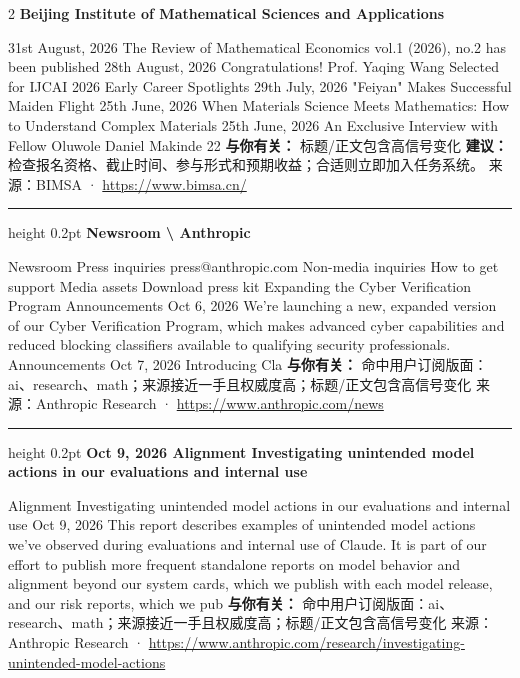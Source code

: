 \documentclass[10.5pt]{ctexart}
\begin{document}
\begin{multicols}{2}
{\large\bfseries Beijing Institute of Mathematical Sciences and Applications}\par
31st August, 2026 The Review of Mathematical Economics vol.1 (2026), no.2 has been published 28th August, 2026 Congratulations! Prof. Yaqing Wang Selected for IJCAI 2026 Early Career Spotlights 29th July, 2026 "Feiyan" Makes Successful Maiden Flight 25th June, 2026 When Materials Science Meets Mathematics: How to Understand Complex Materials 25th June, 2026 An Exclusive Interview with Fellow Oluwole Daniel Makinde 22
\textbf{与你有关：} 标题/正文包含高信号变化
\textbf{建议：} 检查报名资格、截止时间、参与形式和预期收益；合适则立即加入任务系统。
{\footnotesize\color{ormuted} 来源：BIMSA · \url{https://www.bimsa.cn/}}
\vspace{2mm}
\hrule height 0.2pt
\vspace{2mm}
{\large\bfseries Newsroom \textbackslash{} Anthropic}\par
Newsroom Press inquiries press@anthropic.com Non-media inquiries How to get support Media assets Download press kit Expanding the Cyber Verification Program Announcements Oct 6, 2026 We’re launching a new, expanded version of our Cyber Verification Program, which makes advanced cyber capabilities and reduced blocking classifiers available to qualifying security professionals. Announcements Oct 7, 2026 Introducing Cla
\textbf{与你有关：} 命中用户订阅版面：ai、research、math；来源接近一手且权威度高；标题/正文包含高信号变化
{\footnotesize\color{ormuted} 来源：Anthropic Research · \url{https://www.anthropic.com/news}}
\vspace{2mm}
\hrule height 0.2pt
\vspace{2mm}
{\large\bfseries Oct 9, 2026 Alignment Investigating unintended model actions in our evaluations and internal use}\par
Alignment Investigating unintended model actions in our evaluations and internal use Oct 9, 2026 This report describes examples of unintended model actions we’ve observed during evaluations and internal use of Claude. It is part of our effort to publish more frequent standalone reports on model behavior and alignment beyond our system cards, which we publish with each model release, and our risk reports, which we pub
\textbf{与你有关：} 命中用户订阅版面：ai、research、math；来源接近一手且权威度高；标题/正文包含高信号变化
{\footnotesize\color{ormuted} 来源：Anthropic Research · \url{https://www.anthropic.com/research/investigating-unintended-model-actions}}

\end{multicols}
\end{document}
